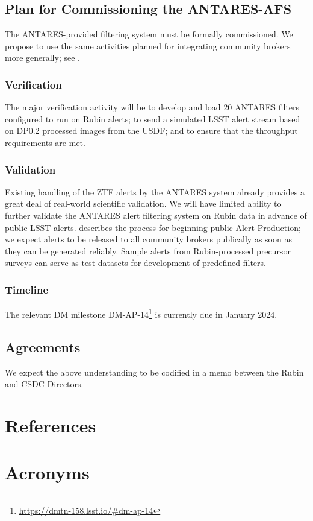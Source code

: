 \documentclass[DM,authoryear,toc]{lsstdoc}
\begin{document}
\subsection{Plan for Commissioning the ANTARES-AFS}

The ANTARES-provided filtering system must be formally commissioned.  
We propose to use the same activities planned for integrating community brokers more generally; see .

\subsubsection{Verification}

The major verification activity will be to develop and load 20 ANTARES filters configured to run on Rubin alerts; to send a simulated LSST alert stream based on DP0.2 processed images from the USDF; and to ensure that the throughput requirements are met.  

\subsubsection{Validation}

Existing handling of the ZTF alerts by the ANTARES system already provides a great deal of real-world scientific validation.
We will have limited ability to further validate the ANTARES alert filtering system on Rubin data in advance of public LSST alerts.
 describes the process for beginning public Alert Production; we expect alerts to be released to all community brokers publically as soon as they can be generated reliably.
Sample alerts from Rubin-processed precursor surveys can serve as test datasets for development of predefined filters.


\subsubsection{Timeline}

The relevant DM milestone DM-AP-14\footnote{\url{https://dmtn-158.lsst.io/\#dm-ap-14}} is currently due in January 2024.
\subsection{Agreements}

We expect the above understanding to be codified in a memo between the Rubin and CSDC Directors.

\appendix
\section{References} \label{sec:bib}
\renewcommand{\refname}{} %


\section{Acronyms} \label{sec:acronyms}

\end{document}
